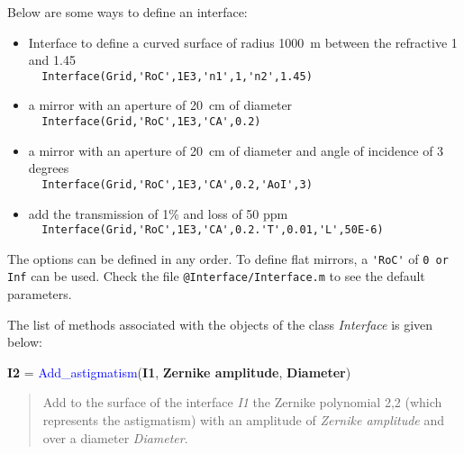 Below are some ways to define an interface:
\begin{itemize}
  \item Interface to define a curved surface of radius 1000~m between the refractive 1 and 1.45 \\
        \verb?  Interface(Grid,'RoC',1E3,'n1',1,'n2',1.45) ?
  \item a mirror with an aperture of 20~cm of diameter \\
      \verb?  Interface(Grid,'RoC',1E3,'CA',0.2) ?
   \item a mirror with an aperture of 20~cm of diameter and angle of incidence of 3 degrees \\
      \verb?  Interface(Grid,'RoC',1E3,'CA',0.2,'AoI',3) ?
  \item add the transmission of 1\% and loss of 50 ppm\\
        \verb?  Interface(Grid,'RoC',1E3,'CA',0.2.'T',0.01,'L',50E-6) ?
\end{itemize}
The options can be defined in any order. To define flat mirrors, a \verb?'RoC'? of \verb?0 or Inf? can be used. Check the file \verb?@Interface/Interface.m? to see the default parameters.

The list of methods associated with the objects of the class \textsl{Interface} is given below:

\noindent \textbf{I2} = \textcolor{blue}{Add\_astigmatism}(\textbf{I1}, \textbf{Zernike amplitude}, \textbf{Diameter})
\vspace*{-0.2cm}
\begin{quote}
Add to the surface of the interface \textsl{I1} the Zernike polynomial 2,2 (which represents the astigmatism) with an amplitude of \textsl{Zernike amplitude} and over a diameter \textsl{Diameter}.
\end{quote}


